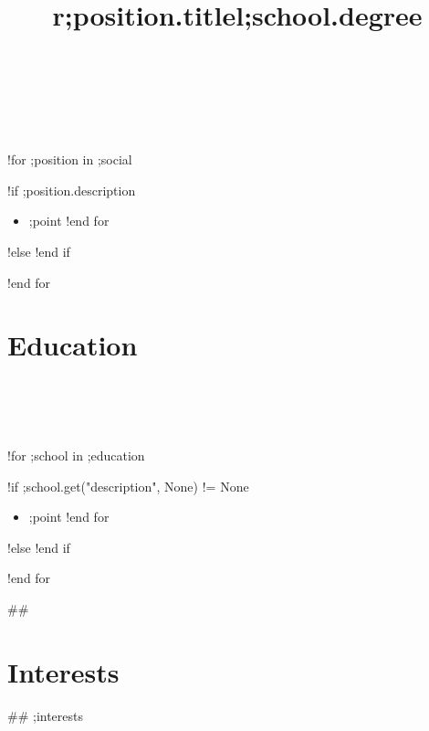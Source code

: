 \documentclass[margin,line]{res}
\begin{document}
\begin{sloppypar}
\begin{resume}
\begin{format}
  \title{r}\\
  \\
  \body\\
\end{format}

!for ;position in ;social
    \title{;position.title}
    \begin{position}
        \vspace{-.3cm}
        !if ;position.description
            \begin{itemize}
            !for ;point in ;position.description
                \item ;point
            !end for
            \end{itemize}
        !else
            \vspace{-.2cm}
        !end if
    \end{position}
!end for


\section{Education}

\begin{format}
  \title{l}\\
  \\
  \body\\
\end{format}

!for ;school in ;education
    \title{\textbf{;school.degree}}
    \begin{position}
        \vspace{-.3cm}
        !if ;school.get("description", None) != None
            \begin{itemize}
            !for ;point in ;school.description
                \item ;point
            !end for
            \end{itemize}
        !else
            \vspace{-.2cm}
        !end if
    \end{position}
!end for

## \section{Interests}
## ;interests


\vfill

\end{resume}
\end{sloppypar}
\end{document}
